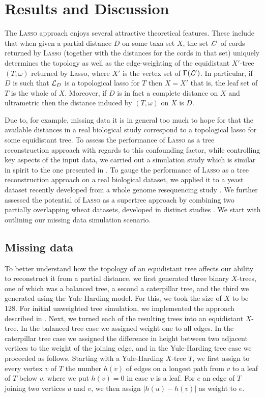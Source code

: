 \section{Results and Discussion}
\label{sec:results}

The \textsc{Lasso} approach enjoys several attractive theoretical
features. These include that when given a partial distance $D$ on some taxa
set $X$, the set ${\mathcal L}'$ of cords returned by \textsc{Lasso} (together with the
distances for the cords in that set) uniquely determines the topology as well
as the edge-weighting of the equidistant $X'$-tree $(T,\omega)$ returned by
{\sc Lasso}, where $X'$ is the vertex set of $\Gamma({\mathcal L}')$.  In particular,
if $D$ is such that ${\mathcal L}_D$ is a topological lasso for $T$ then $X=X'$ that
is, the leaf set of $T$ is the whole of $X$.  Moreover, if $D$ is in fact a
complete distance on $X$ and ultrametric then the distance induced by
$(T,\omega)$ on $X$ is $D$.

Due to, for example, missing data it is in general too much to hope for that
the available distances in a real biological study correspond to a topological
lasso for some equidistant tree. To assess the performance of \textsc{Lasso}
as a tree reconstruction approach with regards to this confounding factor,
while controlling key aspects of the input data, we carried out a simulation
study which is similar in spirit to the one presented in
\cite{criscuolo2008fastnj}.  To gauge the performance of \textsc{Lasso} as a
tree reconstruction approach on a real biological dataset, we applied it to a
yeast dataset \cite{west14ribosomal} recently developed from a whole genome
resequencing study \cite{liti}. We further assessed the potential of
\textsc{Lasso} as a supertree approach by combining two partially overlapping
wheat datasets, developed in distinct studies \cite{gediflux, muge}.  We start
with outlining our missing data simulation scenario.

\subsection{Missing data}
\label{sec:missing-data-disc}

To better understand how the topology of an equidistant tree affects our
ability to reconstruct it from a partial distance, we first generated three
binary $X$-trees, one of which was a balanced tree, a second a caterpillar
tree, and the third we generated using the Yule-Harding model. For this, we
took the size of $X$ to be 128.  For initial unweighted tree simulation, we
implemented the approach described in \cite[Section
2.5]{semple2003phylogenetics}.  Next, we turned each of the resulting trees
into an equidistant $X$-tree. In the balanced tree case we assigned weight one
to all edges. In the caterpillar tree case we assigned the difference in
height between two adjacent vertices to the weight of the joining edge, and in
the Yule-Harding tree case we proceeded as follows. Starting with a
Yule-Harding $X$-tree $T$, we first assign to every vertex $v$ of $T$ the
number $h(v)$ of edges on a longest path from $v$ to a leaf of $T$ below $v$,
where we put $h(v)=0$ in case $v$ is a leaf.  For $e$ an edge of $T$ joining
two vertices $u$ and $v$, we then assign $|h(u)-h(v)|$ as weight to $e$.

